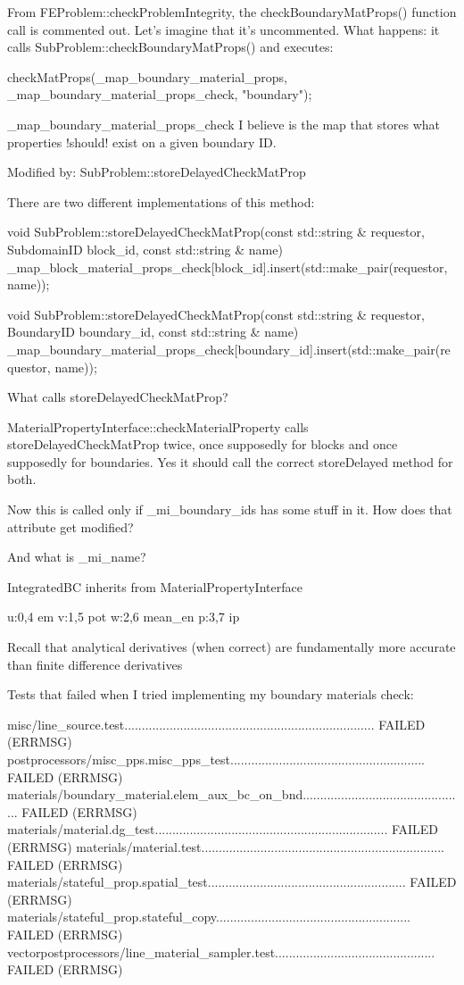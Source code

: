 {From FEProblem::checkProblemIntegrity, the checkBoundaryMatProps() function call is commented out. Let's imagine that it's uncommented. What happens: it calls SubProblem::checkBoundaryMatProps() and executes:

  checkMatProps(_map_boundary_material_props, _map_boundary_material_props_check, "boundary");


_map_boundary_material_props_check I believe is the map that stores what properties !should! exist on a given boundary ID.

Modified by: SubProblem::storeDelayedCheckMatProp

There are two different implementations of this method:

void
SubProblem::storeDelayedCheckMatProp(const std::string & requestor, SubdomainID block_id, const std::string & name)
{
  _map_block_material_props_check[block_id].insert(std::make_pair(requestor, name));
}

void
SubProblem::storeDelayedCheckMatProp(const std::string & requestor, BoundaryID boundary_id, const std::string & name)
{
  _map_boundary_material_props_check[boundary_id].insert(std::make_pair(requestor, name));
}

What calls storeDelayedCheckMatProp?

MaterialPropertyInterface::checkMaterialProperty calls storeDelayedCheckMatProp twice, once supposedly for blocks and once supposedly for boundaries. Yes it should call the correct storeDelayed method for both.

Now this is called only if _mi_boundary_ids has some stuff in it. How does that attribute get modified?

And what is _mi_name?

IntegratedBC inherits from MaterialPropertyInterface

u:0,4 em
v:1,5 pot
w:2,6 mean_en
p:3,7 ip

Recall that analytical derivatives (when correct) are fundamentally  more accurate than finite difference derivatives

Tests that failed when I tried implementing my boundary materials check:

misc/line_source.test........................................................................ FAILED (ERRMSG)
postprocessors/misc_pps.misc_pps_test........................................................ FAILED (ERRMSG)
materials/boundary_material.elem_aux_bc_on_bnd............................................... FAILED (ERRMSG)
materials/material.dg_test................................................................... FAILED (ERRMSG)
materials/material.test...................................................................... FAILED (ERRMSG)
materials/stateful_prop.spatial_test......................................................... FAILED (ERRMSG)
materials/stateful_prop.stateful_copy........................................................ FAILED (ERRMSG)
vectorpostprocessors/line_material_sampler.test.............................................. FAILED (ERRMSG)

}

